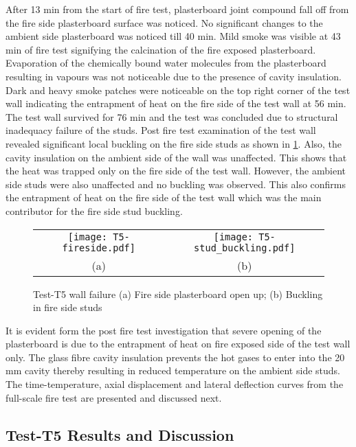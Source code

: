 After 13 min from the start of fire test, plasterboard joint compound fall off from the fire side plasterboard surface was noticed. No significant changes to the ambient side plasterboard was noticed till 40 min. Mild smoke was visible at 43 min of fire test signifying the calcination of the fire exposed plasterboard. Evaporation of the chemically bound water molecules from the plasterboard resulting in vapours was not noticeable due to the presence of cavity insulation. Dark and heavy smoke patches were noticeable on the top right corner of the test wall indicating the entrapment of heat on the fire side of the test wall at 56 min. The test wall survived for 76 min and the test was concluded due to structural inadequacy failure of the studs. Post fire test examination of the test wall revealed significant local buckling on the fire side studs as shown in \cref{fig:T5-failure}. Also, the cavity insulation on the ambient side of the wall was unaffected. This shows that the heat was trapped only on the fire side of the test wall. However, the ambient side studs were also unaffected and no buckling was observed. This also confirms the entrapment of heat on the fire side of the test wall which was the main contributor for the fire side stud buckling.
\begin{figure}[!htbp]
	\centering	
		\begin{tabular}{cc}
			\texttt{[image: T5-fireside.pdf]} & \texttt{[image: T5-stud\_buckling.pdf]} \\
			(a) & (b) \\
			\end{tabular}
		\caption{Test-T5 wall failure (a) Fire side plasterboard open up; (b) Buckling in fire side studs}
		\label{fig:T5-failure}
\end{figure}
It is evident form the post fire test investigation that severe opening of the plasterboard is due to the entrapment of heat on fire exposed side of the test wall only. The glass fibre cavity insulation prevents the hot gases to enter into the 20 mm cavity thereby resulting in reduced temperature on the ambient side studs. The time-temperature, axial displacement and lateral deflection curves from the full-scale fire test are presented and discussed next.

\subsection{Test-T5 Results and Discussion}

